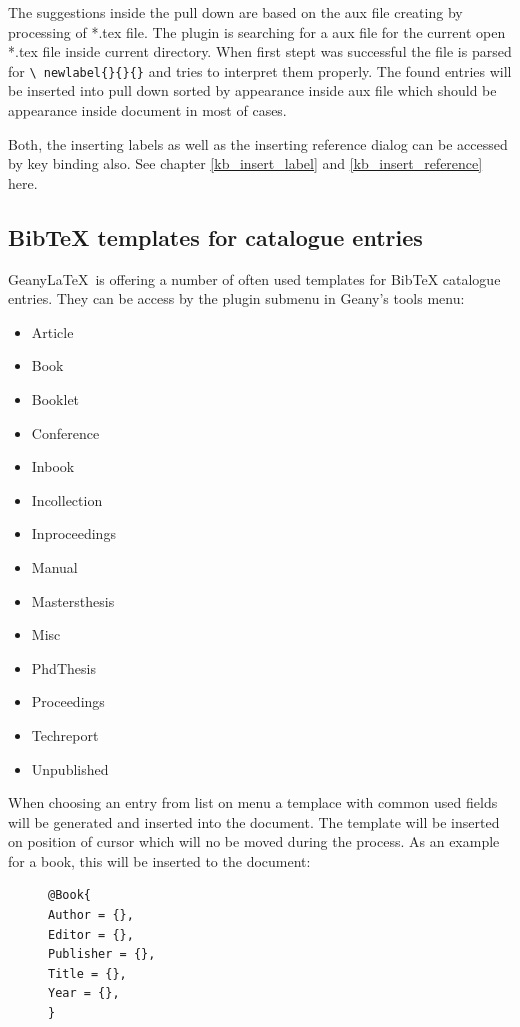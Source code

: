 \documentclass[%
a4paper,%
10pt,%
oneside,%
DIV18,
headsepline,
plainheadsepline,
footsepline,
plainfootsepline,
bibtotoc,%
liststotoc,%
BCOR12mm,%
halfparskip,%
openany,%
]{scrartcl}
\begin{document}
The suggestions inside the pull down are based on the aux file creating
by processing of *.tex file. The plugin is searching for a aux file
for the current open *.tex file inside current directory. When first stept
was successful the file is parsed for \texttt{\textbackslash
newlabel\{\}\{\}\{\}} and tries to interpret them properly. The found
entries will be inserted into pull down sorted by appearance inside aux
file which should be appearance inside document in most of cases.

Both, the inserting labels as well as the inserting reference dialog
can be accessed by key binding also. See chapter \ref{kb_insert_label}
and \ref{kb_insert_reference} here.

\subsection{BibTeX templates for catalogue entries}
Geany\LaTeX\ is offering a number of often used templates for BibTeX
catalogue entries. They can be access by the plugin submenu in Geany's
tools menu:
\begin{itemize}
	\item Article
	\item Book
	\item Booklet
	\item Conference
	\item Inbook
	\item Incollection
	\item Inproceedings
	\item Manual
	\item Mastersthesis
	\item Misc
	\item PhdThesis
	\item Proceedings
	\item Techreport
	\item Unpublished
\end{itemize}
When choosing an entry from list on menu a templace with common used
fields will be generated and inserted into the document.
The template will be inserted on position of cursor which will
no be moved during the process. As an example for a book, this will be
inserted to the document:

\begin{figure}[h!]
\begin{lstlisting}
@Book{
Author = {},
Editor = {},
Publisher = {},
Title = {},
Year = {},
}
\end{lstlisting}
\end{figure}
\end{document}
